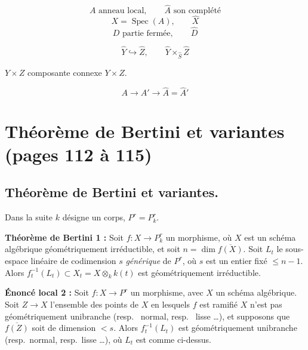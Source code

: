 \documentclass[11pt,a4paper]{article}
\begin{document}

\[ A \text{ anneau local}, \qquad \hat{A} \text{ son complété} \]
\[ X = \operatorname{Spec}(A), \qquad \hat{X} \]
\[ D \text{ partie fermée}, \qquad \hat{D} \]

\[ \hat{Y} \hookrightarrow \hat{Z}, \qquad \hat{Y} \times_{\hat{S}} \hat{Z} \]

$Y \times Z$ \ill{} composante connexe \ill{} $Y \times Z$.


\[ A \longrightarrow A' \longrightarrow \hat{A} = \hat{A}' \]


\section*{Théorème de Bertini et variantes (pages 112 à 115)}


\subsection*{Théorème de Bertini et variantes.}

Dans la suite $k$ désigne un corps, $P^{r} = P^{r}_{k}$.

\textbf{Théorème de Bertini 1 :} Soit $f : X \to P^{r}_{k}$ un morphisme, où
$X$ est un schéma algébrique géométriquement irréductible, et soit $n = \dim
\overline{f(X)}$. Soit $L_{t}$ le \struck{\ill{}} sous-espace linéaire de
codimension $s$ \emph{générique} de $P^{r}$, où $s$ est un entier fixé
$\leqslant n-1$. Alors  $f_{t}^{-1}(L_{t}) \subset X_{t} =
X \otimes_{k} k(t)$ est géométriquement irréductible.


\textbf{Énoncé local 2 :} Soit $f : X \to P^{r}$ un morphisme, avec $X$ un
schéma algébrique.  Soit $Z \to X$
\struck{\ill{}} l'ensemble des points de $X$ en lesquels $f$ est 
ramifié   $X$ n'est pas géométriquement
unibranche (resp.\  normal, resp.\  lisse …),
 et supposons que $\overline{f(Z)}$ soit de dimension $< s$.
Alors  $f_{t}^{-1}(L_{t})$ est géométriquement unibranche
(resp.\ normal, resp.\ lisse …), où $L_{t}$ est comme ci-dessus.
\end{document}
